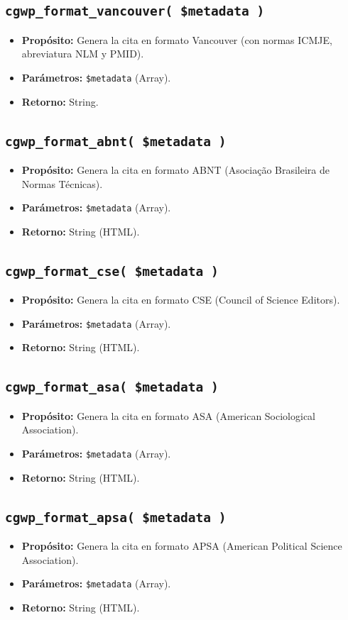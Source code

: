 \documentclass[11pt, a4paper]{article}
\begin{document}
\subsection{\texttt{cgwp\_format\_vancouver( \$metadata )}}
\begin{itemize}
\item \textbf{Propósito:} Genera la cita en formato Vancouver (con normas ICMJE, abreviatura NLM y PMID).
\item \textbf{Parámetros:} \texttt{\$metadata} (Array).
\item \textbf{Retorno:} String.
\end{itemize}
\subsection{\texttt{cgwp\_format\_abnt( \$metadata )}}
\begin{itemize}
\item \textbf{Propósito:} Genera la cita en formato ABNT (Asociação Brasileira de Normas Técnicas).
\item \textbf{Parámetros:} \texttt{\$metadata} (Array).
\item \textbf{Retorno:} String (HTML).
\end{itemize}
\subsection{\texttt{cgwp\_format\_cse( \$metadata )}}
\begin{itemize}
\item \textbf{Propósito:} Genera la cita en formato CSE (Council of Science Editors).
\item \textbf{Parámetros:} \texttt{\$metadata} (Array).
\item \textbf{Retorno:} String (HTML).
\end{itemize}
\subsection{\texttt{cgwp\_format\_asa( \$metadata )}}
\begin{itemize}
\item \textbf{Propósito:} Genera la cita en formato ASA (American Sociological Association).
\item \textbf{Parámetros:} \texttt{\$metadata} (Array).
\item \textbf{Retorno:} String (HTML).
\end{itemize}
\subsection{\texttt{cgwp\_format\_apsa( \$metadata )}}
\begin{itemize}
\item \textbf{Propósito:} Genera la cita en formato APSA (American Political Science Association).
\item \textbf{Parámetros:} \texttt{\$metadata} (Array).
\item \textbf{Retorno:} String (HTML).
\end{itemize}
\end{document}
